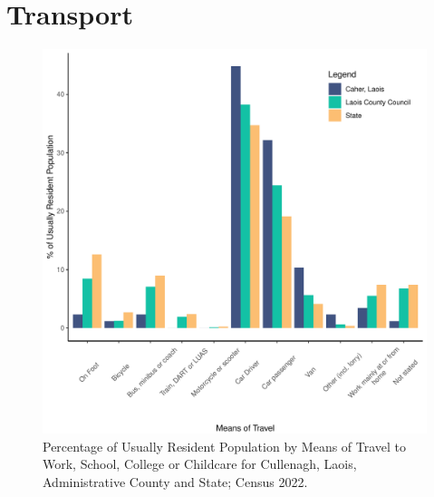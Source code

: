 \documentclass{article}
\begin{document}
\section{Transport}\label{sect:Trans}
\begin{figure}[H]
	\centering
	\includegraphics[width = 120mm]{../figures/TravelED.pdf}
	\caption{Percentage of Usually Resident Population by Means of Travel to Work, School, College or Childcare for Cullenagh, Laois, Administrative County and State; Census 2022.}
	\label{fig:vbnv}
	\end{figure}
\end{document}
